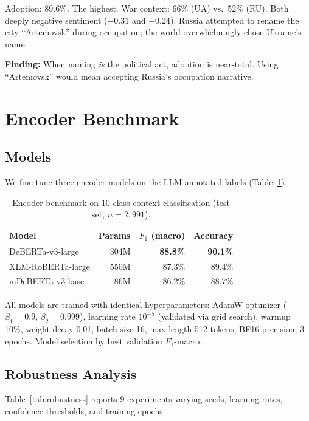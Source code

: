 \documentclass{article}
\begin{document}
Adoption: 89.6\%. The highest. War context: 66\% (UA) vs.\ 52\% (RU). Both deeply negative sentiment ($-0.31$ and $-0.24$). Russia attempted to rename the city ``Artemovsk'' during occupation; the world overwhelmingly chose Ukraine's name.

\textbf{Finding:} When naming \textit{is} the political act, adoption is near-total. Using ``Artemovsk'' would mean accepting Russia's occupation narrative.

\section{Encoder Benchmark}
\label{sec:benchmark}

\subsection{Models}

We fine-tune three encoder models on the LLM-annotated labels (Table~\ref{tab:benchmark}).

\begin{table}[t]
\centering
\small
\caption{Encoder benchmark on 10-class context classification (test set, $n = 2{,}991$).}
\label{tab:benchmark}
\begin{tabular}{lrrr}
\toprule
\textbf{Model} & \textbf{Params} & \textbf{$F_1$ (macro)} & \textbf{Accuracy} \\
\midrule
DeBERTa-v3-large & 304M & \textbf{88.8\%} & \textbf{90.1\%} \\
XLM-RoBERTa-large & 550M & 87.3\% & 89.4\% \\
mDeBERTa-v3-base & 86M & 86.2\% & 88.7\% \\
\bottomrule
\end{tabular}
\end{table}

All models are trained with identical hyperparameters: AdamW optimizer ($\beta_1{=}0.9$, $\beta_2{=}0.999$), learning rate $10^{-5}$ (validated via grid search), warmup 10\%, weight decay 0.01, batch size 16, max length 512 tokens, BF16 precision, 3 epochs. Model selection by best validation $F_1$-macro.

\subsection{Robustness Analysis}

Table~\ref{tab:robustness} reports 9 experiments varying seeds, learning rates, confidence thresholds, and training epochs.
\end{document}
